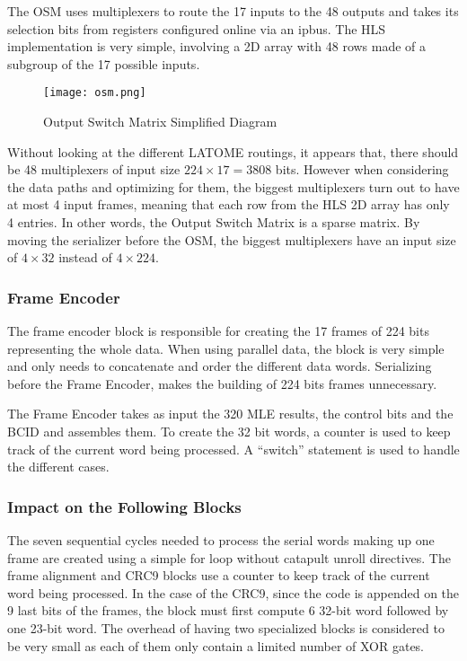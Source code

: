 The OSM uses multiplexers to route the 17 inputs to the 48 outputs and takes its selection bits from registers configured online via an ipbus. The HLS implementation is very simple, involving a 2D array with 48 rows made of a subgroup of the 17 possible inputs.

\begin{figure}
    \centering
    \texttt{[image: osm.png]}
    \caption{Output Switch Matrix Simplified Diagram}
    \label{fig:osm-design}
\end{figure}

Without looking at the different LATOME routings, it appears that, there should be 48 multiplexers of input size \(224\times17=3808\) bits. However when considering the data paths and optimizing for them, the biggest multiplexers turn out to have at most 4 input frames, meaning that each row from the HLS 2D array has only 4 entries. In other words, the Output Switch Matrix is a sparse matrix. By moving the serializer before the OSM, the biggest multiplexers have an input size of \(4\times32\) instead of \(4\times224\).

\subsubsection{Frame Encoder}

The frame encoder block is responsible for creating the 17 frames of 224 bits representing the whole data. When using parallel data, the block is very simple and only needs to concatenate and order the different data words. Serializing before the Frame Encoder, makes the building of 224 bits frames unnecessary.

The Frame Encoder takes as input the 320 MLE results, the control bits and the BCID and assembles them. To create the 32 bit words, a counter is used to keep track of the current word being processed. A ``switch'' statement is used to handle the different cases.


\subsubsection{Impact on the Following Blocks}

The seven sequential cycles needed to process the serial words making up one frame are created using a simple for loop without catapult unroll directives. The frame alignment and CRC9 blocks use a counter to keep track of the current word being processed. In the case of the CRC9, since the code is appended on the 9 last bits of the frames, the block must first compute 6 32-bit word followed by one 23-bit word. The overhead of having two specialized blocks is considered to be very small as each of them only contain a limited number of XOR gates.

